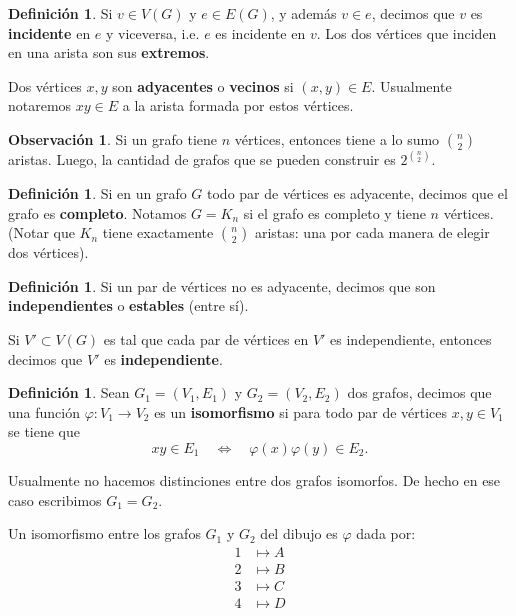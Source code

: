 \documentclass[12pt]{report}
\theoremstyle{plain}
\theoremstyle{definition}
\newtheorem{definition}[theorem]{Definición}
\newtheorem{obs}[theorem]{Observación}
\begin{document}
\begin{definition}
Si $v \in V(G)$ y $e \in E(G)$, y además $v \in e$, decimos que $v$ es \textbf{incidente} en $e$ y viceversa, i.e. $e$ es incidente en $v$. Los dos vértices que inciden en una arista son sus \textbf{extremos}.

Dos vértices $x,y$ son \textbf{adyacentes} o \textbf{vecinos} si $(x,y) \in E$. Usualmente notaremos $xy \in E$ a la arista formada por estos vértices.
\end{definition}

\begin{obs}
Si un grafo tiene $n$ vértices, entonces tiene a lo sumo $\binom n 2$ aristas. Luego, la cantidad de grafos que se pueden construir es $2^{\binom n 2}$.
\end{obs}

\begin{definition}
Si en un grafo $G$ todo par de vértices es adyacente, decimos que el grafo es \textbf{completo}. Notamos $ G =K_n$ si el grafo es completo y tiene $n$ vértices. (Notar que $K_n$ tiene exactamente $\binom n 2$ aristas: una por cada manera de elegir dos vértices).
\end{definition}


\begin{definition}
Si un par de vértices no es adyacente, decimos que son \textbf{independientes} o \textbf{estables} (entre sí).

Si $V' \subset V(G)$ es tal que cada par de vértices en $V'$ es independiente, entonces decimos que $V'$ es \textbf{independiente}.
\end{definition}

\begin{definition}
Sean $G_1 = (V_1,E_1)$ y $G_2 = (V_2, E_2)$ dos grafos, decimos que una función $\varphi : V_1 \rightarrow V_2$ es un \textbf{isomorfismo} si para todo par de vértices $x,y \in V_1$ se tiene que
\[
    xy \in E_1 \quad \Longleftrightarrow \quad \varphi (x) \varphi (y) \in E_2.
\]

Usualmente no hacemos distinciones entre dos grafos isomorfos. De hecho en ese caso escribimos $G_1 = G_2$.
\end{definition}


Un isomorfismo entre los grafos $G_1$ y $G_2$ del dibujo es $\varphi$ dada por:
\begin{align*}
1 &\longmapsto A \\
        2 &\longmapsto B \\
        3 &\longmapsto C \\
        4 &\longmapsto D
\end{align*}
\end{document}
